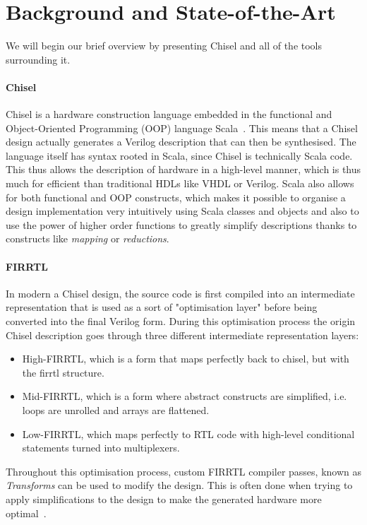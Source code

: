 \documentclass[conference]{IEEEtran}
\begin{document}
\section{Background and State-of-the-Art}
\label{sec:background}
We will begin our brief overview by presenting Chisel and all of the tools surrounding it.
\paragraph{Chisel} Chisel is a hardware construction language embedded in the functional and Object-Oriented Programming (OOP) language Scala~\cite{scala:2006}. This means that a Chisel design actually generates a Verilog description that can then be synthesised. The language itself has syntax rooted in Scala, since Chisel is technically Scala code. This thus allows the description of hardware in a high-level manner, which is thus much for efficient than traditional HDLs like VHDL or Verilog. Scala also allows for both functional and OOP constructs, which makes it possible to organise a design implementation very intuitively using Scala classes and objects and also to use the power of higher order functions to greatly simplify descriptions thanks to constructs like \textit{mapping} or \textit{reductions}.
\paragraph{FIRRTL} In modern a Chisel design, the source code is first compiled into an intermediate representation that is used as a sort of "optimisation layer" before being converted into the final Verilog form. During this optimisation process the origin Chisel description goes through three different intermediate representation layers:
\begin{itemize}
\item High-FIRRTL, which is a form that maps perfectly back to chisel, but with the firrtl structure.
\item Mid-FIRRTL, which is a form where abstract constructs are simplified, i.e. loops are unrolled and arrays are flattened.
\item Low-FIRRTL, which maps perfectly to RTL code with high-level conditional statements turned into multiplexers.
\end{itemize}
Throughout this optimisation process, custom FIRRTL compiler passes, known as \textit{Transforms} can be used to modify the design. This is often done when trying to apply simplifications to the design to make the generated hardware more optimal~\cite{firrtlTechRep2016}.
\end{document}
